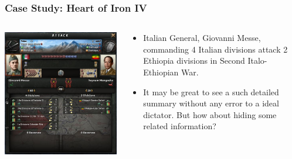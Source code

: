\documentclass{beamer}
\begin{document}
\begin{frame}

\frametitle{Case Study: Heart of Iron IV }

\begin{columns}[T]
    \begin{column}{.5\textwidth}
            \includegraphics[width=\textwidth]{hoi4.jpg}
    \end{column}        
    \begin{column}{.5\textwidth}

\begin{itemize}
\item Italian General, Giovanni Messe, commanding 4 Italian divisions attack 2 Ethiopia divisions in Second Italo-Ethiopian War. 

\item It may be great to see a such detailed summary without any error to a ideal dictator. But how about hiding some related information?
\end{itemize}

    \end{column}
\end{columns}

\end{frame}
\end{document}
